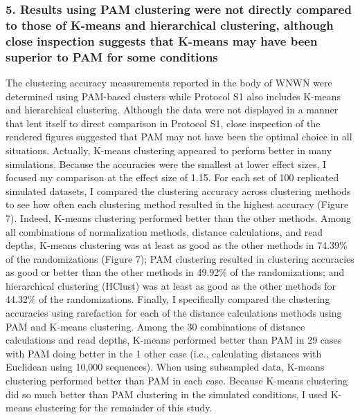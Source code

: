 \documentclass[
]{article}
\begin{document}
\hypertarget{results-using-pam-clustering-were-not-directly-compared-to-those-of-k-means-and-hierarchical-clustering-although-close-inspection-suggests-that-k-means-may-have-been-superior-to-pam-for-some-conditions}{%
\subsubsection{5. Results using PAM clustering were not directly
compared to those of K-means and hierarchical clustering, although close
inspection suggests that K-means may have been superior to PAM for some
conditions}\label{results-using-pam-clustering-were-not-directly-compared-to-those-of-k-means-and-hierarchical-clustering-although-close-inspection-suggests-that-k-means-may-have-been-superior-to-pam-for-some-conditions}}

The clustering accuracy measurements reported in the body of WNWN were
determined using PAM-based clusters while Protocol S1 also includes
K-means and hierarchical clustering. Although the data were not
displayed in a manner that lent itself to direct comparison in Protocol
S1, close inspection of the rendered figures suggested that PAM may not
have been the optimal choice in all situations. Actually, K-means
clustering appeared to perform better in many simulations. Because the
accuracies were the smallest at lower effect sizes, I focused my
comparison at the effect size of 1.15. For each set of 100 replicated
simulated datasets, I compared the clustering accuracy across clustering
methods to see how often each clustering method resulted in the highest
accuracy (Figure 7). Indeed, K-means clustering performed better than
the other methods. Among all combinations of normalization methods,
distance calculations, and read depths, K-means clustering was at least
as good as the other methods in 74.39\% of the randomizations (Figure
7); PAM clustering resulted in clustering accuracies as good or better
than the other methods in 49.92\% of the randomizations; and
hierarchical clustering (HClust) was at least as good as the other
methods for 44.32\% of the randomizations. Finally, I specifically
compared the clustering accuracies using rarefaction for each of the
distance calculations methods using PAM and K-means clustering. Among
the 30 combinations of distance calculations and read depths, K-means
performed better than PAM in 29 cases with PAM doing better in the 1
other case (i.e., calculating distances with Euclidean using 10,000
sequences). When using subsampled data, K-means clustering performed
better than PAM in each case. Because K-means clustering did so much
better than PAM clustering in the simulated conditions, I used K-means
clustering for the remainder of this study.
\end{document}
